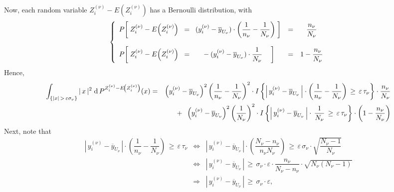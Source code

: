Now, each random variable $Z^{(\nu)}_{i} - E\!\left(Z^{(\nu)}_{i}\right)$ has a Bernoulli distribution, with
\begin{equation*}
\left\{
\begin{array}{lcc}
P\!\left[\;
Z^{(\nu)}_{i} - E\!\left(Z^{(\nu)}_{i}\right) \;\;=\;\; (y^{(\nu)}_{i} - \overline{y}_{U_{\nu}})\cdot\left(\dfrac{1}{n_{\nu}} - \dfrac{1}{N_{\nu}}\right)
\;\right]
& = & \dfrac{n_{\nu}}{N_{\nu}}
\\ \\
P\!\left[\;
Z^{(\nu)}_{i} - E\!\left(Z^{(\nu)}_{i}\right) \;\;=\;\;
{\color{white}??}
-(y^{(\nu)}_{i} - \overline{y}_{U_{\nu}})\cdot\dfrac{1}{N_{\nu}}
{\color{white}??}\;\right]
& = & 1 - \dfrac{n_{\nu}}{N_{\nu}}
\end{array}
\right.
\end{equation*}
Hence,
\begin{eqnarray*}
\int_{\left\{\vert x\vert \,>\, \varepsilon\sigma_{\nu}\right\}}
\vert\,x\,\vert^{2}\;
\textnormal{d}\,P^{Z^{(\nu)}_{i} - E\!\left(Z^{(\nu)}_{i}\right)}(x)
&=&
\left(y^{(\nu)}_{i} - \overline{y}_{U_{\nu}}\right)^{2}\left(\dfrac{1}{n_{\nu}} - \dfrac{1}{N_{\nu}}\right)^{2} \cdot
I\left\{
\left\vert\,y^{(\nu)}_{i} - \overline{y}_{U_{\nu}}\,\right\vert
\cdot
\left(\frac{1}{n_{\nu}} - \frac{1}{N_{\nu}}\right)
\,\geq\,\varepsilon\,\tau_{\nu}
\right\}
\cdot
\dfrac{n_{\nu}}{N_{\nu}}
\\
&&
+\;\;
\left(y^{(\nu)}_{i} - \overline{y}_{U_{\nu}}\right)^{2}\left(\dfrac{1}{N_{\nu}}\right)^{2} \cdot
I\left\{
\left\vert\,y^{(\nu)}_{i} - \overline{y}_{U_{\nu}}\,\right\vert
\cdot\,
\frac{1}{N_{\nu}}
\,\geq\,\varepsilon\,\tau_{\nu}
\right\}
\cdot
\left(1 - \dfrac{n_{\nu}}{N_{\nu}}\right)
\end{eqnarray*}
Next, note that
\begin{eqnarray*}
\left\vert\,y^{(\nu)}_{i} - \overline{y}_{U_{\nu}}\,\right\vert
\cdot
\left(\dfrac{1}{n_{\nu}} - \dfrac{1}{N_{\nu}}\right)
\,\geq\,\varepsilon\,\tau_{\nu}
&\Longleftrightarrow&
\left\vert\,y^{(\nu)}_{i} - \overline{y}_{U_{\nu}}\,\right\vert
\cdot
\left(\dfrac{N_{\nu} - n_{\nu}}{n_{\nu}N_{\nu}}\right)
\,\geq\,\varepsilon\,\sigma_{\nu}
\cdot
\sqrt{\dfrac{N_{\nu}-1}{N_{\nu}}}
\\
&\Longleftrightarrow&
\left\vert\,y^{(\nu)}_{i} - \overline{y}_{U_{\nu}}\,\right\vert
\,\geq\,
\sigma_{\nu}\cdot\varepsilon
\cdot
\dfrac{n_{\nu}}{N_{\nu} - n_{\nu}}
\cdot
\sqrt{N_{\nu}(N_{\nu}-1)}
\\
&\Longrightarrow&
\left\vert\,y^{(\nu)}_{i} - \overline{y}_{U_{\nu}}\,\right\vert
\,\geq\,
\sigma_{\nu}\cdot\varepsilon,
\end{eqnarray*}
